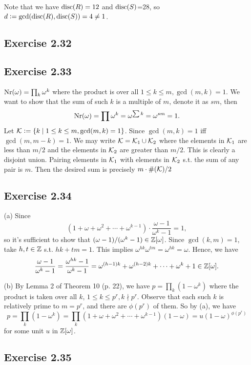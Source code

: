 \documentclass[../Marcus.tex]{subfiles}
\begin{document}
Note that we have $\operatorname{disc}(R)=12$ and $\operatorname{disc}(S)$=28, so $d:=\gcd(\operatorname{disc}(R),\operatorname{disc}(S))=4\neq1$.

\subsection*{Exercise 2.32}

\subsection*{Exercise 2.33}

$\operatorname{Nr}(\omega)=\prod_{k} \omega^k$ where the product is over all $1\leq k\leq m,\gcd(m,k)=1$. We want to show that the sum of such $k$ is a multiple of $m$, denote it as $sm$, then 
$$
\operatorname{Nr}(\omega)=\prod \omega^k=\omega^{\sum k}=\omega^{sm}=1.
$$
Let $\mathcal{K}:=\{k\mid 1\leq k\leq m,\gcd(m,k)=1\}$. Since $\gcd(m,k)=1$ iff $\gcd(m,m-k)=1$. We may write $\mathcal{K}=\mathcal{K}_1\cup\mathcal{K}_2$ where the elements in $\mathcal{K}_1$ are less than $m/2$ and the elements in $\mathcal{K}_2$ are greater than $m/2$. This is clearly a disjoint union. Pairing elements in $\mathcal{K}_1$ with elements in $\mathcal{K}_2$ s.t. the sum of any pair is $m$. Then the desired sum is precisely $m\cdot\#(\mathcal{K})/2$

\subsection*{Exercise 2.34}

(a) Since 
$$
\left(1+\omega+\omega^2+\cdots+\omega^{k-1}\right)\cdot\frac{\omega-1}{\omega^k-1}=1,
$$ 
so it's sufficient to show that $(\omega-1)/(\omega^k-1)\in\mathbb{Z}[\omega]$. Since $\gcd(k,m)=1$, take $h,t\in\mathbb{Z}$ s.t. $hk+tm=1$. This implies $\omega^{hk}\omega^{tm}=\omega^{hk}=\omega$. Hence, we have 
$$
\frac{\omega-1}{\omega^k-1}=\frac{\omega^{hk}-1}{\omega^k-1}=\omega^{(h-1)k}+\omega^{(h-2)k}+\cdots+\omega^k+1\in\mathbb{Z}[\omega].
$$

(b) By Lemma 2 of Theorem 10 (p. 22), we have $p=\prod_{k} (1-\omega^k)$ where the product is taken over all $k$, $1\leq k\leq p^r,k\nmid p^r$. Observe that each such $k$ is relatively prime to $m=p^r$, and there are $\phi(p^r)$ of them. So by (a), we have 
$$
p=\prod_{k} (1-\omega^k)= \prod_{k}(1+\omega+\omega^2+\cdots+\omega^{k-1})(1-\omega)=u(1-\omega)^{\phi(p^r)}
$$
for some unit $u$ in $\mathbb{Z}[\omega]$.

\subsection*{Exercise 2.35}
\end{document}
